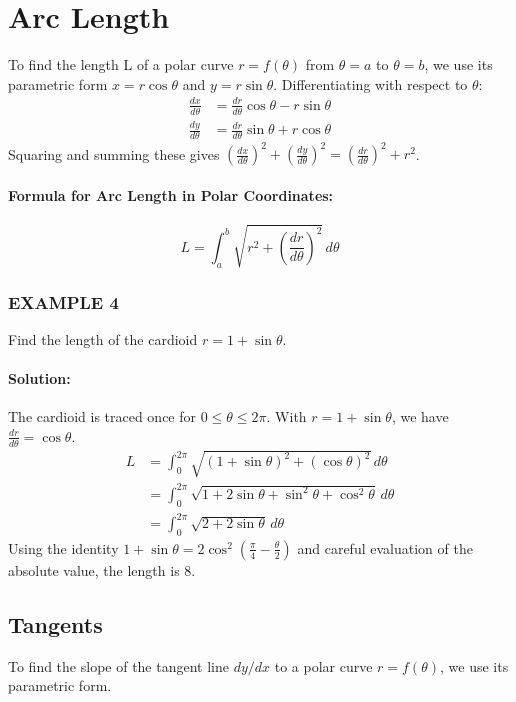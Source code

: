 \documentclass{article}
\begin{document}
\section*{Arc Length}
To find the length L of a polar curve $r = f(\theta)$ from $\theta = a$ to $\theta = b$, we use its parametric form $x = r\cos\theta$ and $y = r\sin\theta$. Differentiating with respect to $\theta$:
\begin{align*}
    \frac{dx}{d\theta} &= \frac{dr}{d\theta}\cos\theta - r\sin\theta \\
    \frac{dy}{d\theta} &= \frac{dr}{d\theta}\sin\theta + r\cos\theta
\end{align*}
Squaring and summing these gives $\left(\frac{dx}{d\theta}\right)^2 + \left(\frac{dy}{d\theta}\right)^2 = \left(\frac{dr}{d\theta}\right)^2 + r^2$.

\paragraph{Formula for Arc Length in Polar Coordinates:}
\[
L = \int_{a}^{b} \sqrt{r^2 + \left(\frac{dr}{d\theta}\right)^2} \, d\theta
\]

\subsubsection*{EXAMPLE 4}
Find the length of the cardioid $r = 1 + \sin\theta$.

\paragraph{Solution:} The cardioid is traced once for $0 \le \theta \le 2\pi$. With $r = 1 + \sin\theta$, we have $\frac{dr}{d\theta} = \cos\theta$.
\begin{align*}
    L &= \int_{0}^{2\pi} \sqrt{(1 + \sin\theta)^2 + (\cos\theta)^2} \, d\theta \\
    &= \int_{0}^{2\pi} \sqrt{1 + 2\sin\theta + \sin^2\theta + \cos^2\theta} \, d\theta \\
    &= \int_{0}^{2\pi} \sqrt{2 + 2\sin\theta} \, d\theta
\end{align*}
Using the identity $1+\sin\theta = 2\cos^2(\frac{\pi}{4}-\frac{\theta}{2})$ and careful evaluation of the absolute value, the length is 8.

\subsection*{Tangents}
To find the slope of the tangent line $dy/dx$ to a polar curve $r = f(\theta)$, we use its parametric form.
\end{document}
